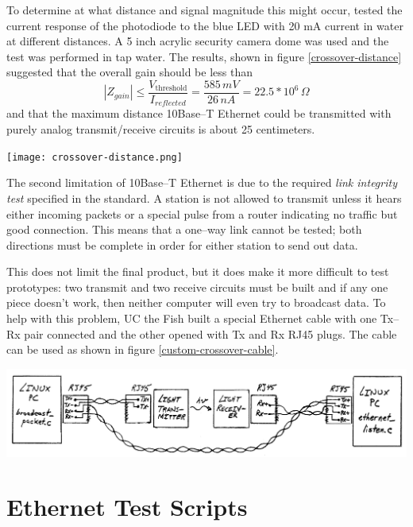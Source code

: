 \documentclass{article}
\begin{document}
To determine at what distance and signal magnitude this might occur,
tested the current response of the photodiode to the blue LED with 20 mA current
in water at different distances.
A 5 inch acrylic security camera dome was used and the test was performed in
tap water.
The results, shown in figure \ref{crossover-distance} suggested that the overall gain
should be less than
\begin{equation}
|Z_{gain}| \leq \frac{V_{\textrm{threshold}}}{I_{reflected}}=\frac{585\,mV}{26\,nA}=22.5*10^{6}\,\Omega
\end{equation}
and that the maximum distance 10Base--T Ethernet could be transmitted with purely analog transmit/receive
circuits is about 25 centimeters.

\begin{center}
	\texttt{[image: crossover-distance.png]}
	\label{crossover-distance}
\end{center}

The second limitation of 10Base--T Ethernet is due to the required \textit{link integrity test}
specified in the standard.
A station is not allowed to transmit unless it hears either incoming packets or
a special pulse from a router indicating no traffic but good connection.
This means that a one--way link cannot be tested; both directions must be complete
in order for either station to send out data.

This does not limit the final product, but it does make it more difficult to test
prototypes: two transmit and two receive circuits must be built and if
any one piece doesn't work, then neither computer will even try to broadcast data.
To help with this problem, UC the Fish built a special Ethernet cable with
one Tx--Rx pair connected and the other opened with Tx and Rx RJ45 plugs.
The cable can be used as shown in figure \ref{custom-crossover-cable}.

\begin{center}
	\includegraphics[width=1\textwidth]{custom_crossover_cable.png}
	\label{custom-crossover-cable}
\end{center}

\appendix

\pagebreak
\section{Ethernet Test Scripts}



\pagebreak


\pagebreak

\end{document}

